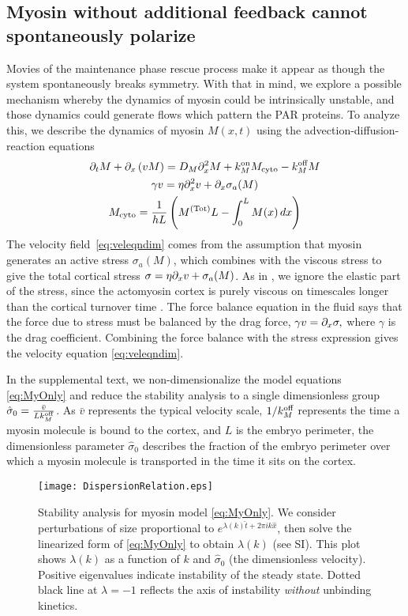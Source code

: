 \documentclass[11pt]{article}
\newcommand{\6}[1]{#1_{\text{6}}}
\newcommand{\3}[1]{#1_{\text{3}}}
\newcommand{\Tot}[1]{#1^\text{(Tot)}}
\newcommand{\My}[1]{#1_M}
\begin{document}
\subsection{Myosin without additional feedback cannot spontaneously polarize}
Movies of the maintenance phase rescue process make it appear as though the system spontaneously breaks symmetry. With that in mind, we explore a possible mechanism whereby the dynamics of myosin could be intrinsically unstable, and those dynamics could generate flows which pattern the PAR proteins. To analyze this, we describe the dynamics of myosin $M(x,t)$ using the advection-diffusion-reaction equations \cite{bois2011pattern}
\begin{subequations}
\label{eq:MyOnly}
\begin{gather}
\Dt M + \Dx \left(v M\right) = D_M \Dx^2 M +\My{\kon}M_\text{cyto} - \My{\koff} M \\
\label{eq:veleqndim}
\gamma v = \eta \Dx^2 v + \Dx \sigma_a(M)\\
M_\text{cyto} = \frac{1}{hL}\left(\Tot{M}L-\int_0^L M(x) \, dx\right)
\end{gather}
\end{subequations}
The velocity field\ \eqref{eq:veleqndim} comes from the assumption that myosin generates an active stress $\sigma_a(M)$, which combines with the viscous stress to give the total cortical stress $\sigma = \eta \partial_x{v} + \sigma_a(M)$. As in \cite{bois2011pattern}, we ignore the elastic part of the stress, since the actomyosin cortex is purely viscous on timescales longer than the cortical turnover time \cite{mayer2010anisotropies}. The force balance equation in the fluid says that the force due to stress must be balanced by the drag force, $\gamma v = \partial_x \sigma,$
where $\gamma$ is the drag coefficient. Combining the force balance with the stress expression gives the velocity equation \eqref{eq:veleqndim}.

In the supplemental text, we non-dimensionalize the model equations \eqref{eq:MyOnly} and reduce the stability analysis to a single dimensionless group $\hat{\sigma}_0 = \frac{\bar v}{L \My{\koff}}$. As $\bar v$ represents the typical velocity scale, $1/\My{\koff}$ represents the time a myosin molecule is bound to the cortex, and $L$ is the embryo perimeter, the dimensionless parameter $\hat \sigma_0$ 
describes the fraction of the embryo perimeter over which a myosin molecule is transported in the time it sits on the cortex.


\begin{figure}
\centering
\texttt{[image: DispersionRelation.eps]}
\caption{\label{fig:DispRelMy} Stability analysis for myosin model \eqref{eq:MyOnly}. We consider perturbations of size proportional to $e^{\lambda(k) \hat{t}+2 \pi i k \hat{x}}$, then solve the linearized form of \eqref{eq:MyOnly} to obtain $\lambda(k)$ (see SI). This plot shows $\lambda(k)$ as a function of $k$ and $\hat{\sigma}_0$ (the dimensionless velocity). Positive eigenvalues indicate instability of the steady state. Dotted black line at $\lambda=-1$ reflects the axis of instability \emph{without} unbinding kinetics.}
\end{figure}
\end{document}
